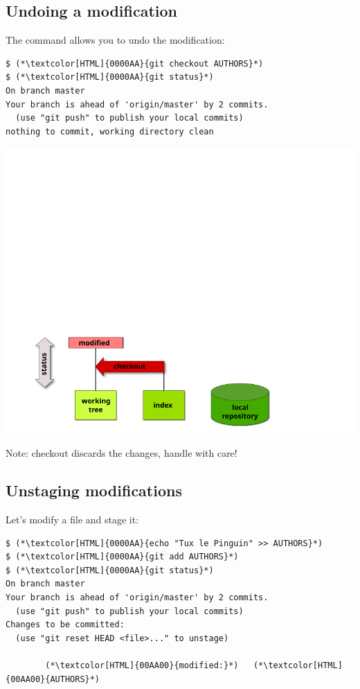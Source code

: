 \subsection{Undoing a modification}
\begin{frame}[fragile]
\subslidetitle
  The command  allows you to undo the modification:
  \begin{lstlisting}
$ (*\textcolor[HTML]{0000AA}{git checkout AUTHORS}*)
$ (*\textcolor[HTML]{0000AA}{git status}*)
On branch master
Your branch is ahead of 'origin/master' by 2 commits.
  (use "git push" to publish your local commits)
nothing to commit, working directory clean
\end{lstlisting}

  \vspace{1em}
  \centerline{\includegraphics{diagrams/undo-modified}}

  \vspace{1em}
  Note: checkout discards the changes, handle with care!
\end{frame}

\subsection{Unstaging modifications}
\begin{frame}[fragile]
\subslidetitle

  Let's modify a file and stage it:

\begin{lstlisting}
$ (*\textcolor[HTML]{0000AA}{echo "Tux le Pinguin" >> AUTHORS}*)
$ (*\textcolor[HTML]{0000AA}{git add AUTHORS}*)
$ (*\textcolor[HTML]{0000AA}{git status}*)
On branch master
Your branch is ahead of 'origin/master' by 2 commits.
  (use "git push" to publish your local commits)
Changes to be committed:
  (use "git reset HEAD <file>..." to unstage)

        (*\textcolor[HTML]{00AA00}{modified:}*)   (*\textcolor[HTML]{00AA00}{AUTHORS}*)
\end{lstlisting}

\end{frame}

